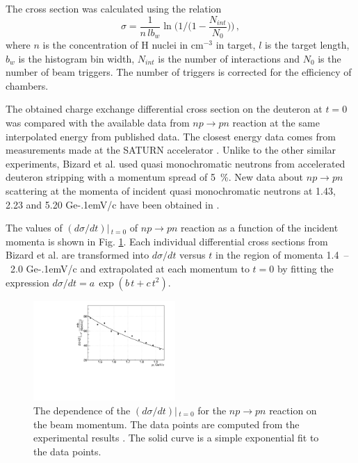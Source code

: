 \documentclass[twocolumn,epjc3]{svjour3}
\newcommand{\np}     {\ensuremath{np \rightarrow pn}\xspace}
\newcommand{\GeVc}   {Ge\kern-.1emV/c\xspace}
\begin{document}
The cross section was calculated using the relation
\begin{equation}
  \sigma =
  \frac{1}{n\,lb_w}\ln\bigg(1\Big/\Big(1-\frac{N_{int}}{N_0}\Big)\bigg)\,,
\end{equation}
where $n$ is the concentration of H nuclei in cm$^{-3}$ in target, $l$ is the
target length, $b_w$ is the histogram bin width, $N_{int}$ is the number of
interactions and $N_0$ is the number of beam triggers. The number of triggers is
corrected for the efficiency of chambers.

The obtained charge exchange differential cross section on the deuteron at $t=0$
was compared with the available data from \np reaction at the same interpolated
energy from published data. The closest energy data comes from measurements made
at the SATURN accelerator \cite{biz75,bys78}. Unlike to the other similar
experiments, Bizard et al. \cite{biz75} used quasi monochromatic neutrons from
accelerated deuteron stripping with a momentum spread of 5~\%. New data about
\np scattering at the momenta of incident quasi monochromatic neutrons at 1.43,
2.23 and 5.20 \GeVc have been obtained in \cite{tro14}.

The values of $(d\sigma/dt)|\,_{t=0}$ of \np reaction as a function of the
incident momenta is shown in Fig. \ref{fig:npsigma}. Each individual
differential cross sections from Bizard et al. \cite{biz75} are transformed into
$d\sigma/dt$ versus $t$ in the region of momenta 1.4~--~2.0 \GeVc and
extrapolated at each momentum to $t=0$ by fitting the expression
$d\sigma/dt = a\,\exp(b\,t + c\,t^2)$.

\begin{figure}[ht]
  \centering
  \includegraphics[width=0.48\textwidth]{np_dSigma.pdf}
  \caption{The dependence of the $(d\sigma/dt)|\,_{t=0}$ for the \np reaction on
    the beam momentum. The data points are computed from the experimental
    results \cite{biz75}. The solid curve is a simple exponential fit to the
    data points.}
  \label{fig:npsigma}
\end{figure}
\end{document}
